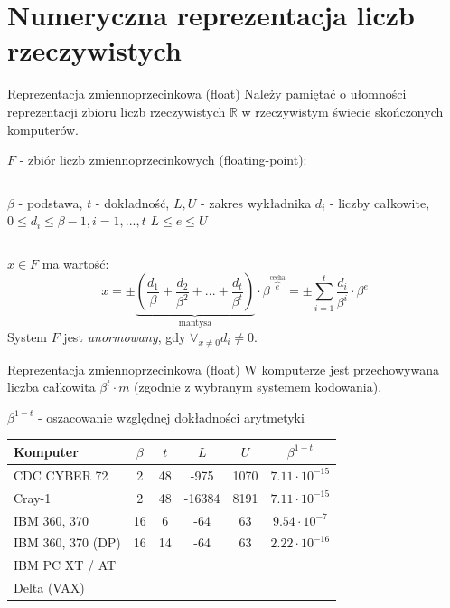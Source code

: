 \section{Numeryczna reprezentacja liczb rzeczywistych}
\begin{frame}{Reprezentacja zmiennoprzecinkowa (float)}
    Należy pamiętać o ułomności reprezentacji zbioru liczb rzeczywistych $\mathbb{R}$ w rzeczywistym świecie skończonych komputerów.
    \begin{block}{}
    $F$ - zbiór liczb zmiennoprzecinkowych (floating-point):\newline
    \begin{columns}
            $\beta$ - podstawa,\newline
            $t$ - dokładność,\newline
            $L, U$ - zakres wykładnika\newline
            $d_i$ - liczby całkowite,
            $0 \le d_i \le \beta - 1, i=1,...,t$
            $L \le e \le U$
    \end{columns}
    $x \in F$ ma wartość:
    \[
    x = \pm \underbrace{\left(\frac{d_1}{\beta} + \frac{d_2}{\beta^2} + ... + \frac{d_t}{\beta^t}\right)}_\text{mantysa} \cdot \beta^{\overbrace{e}^\text{cecha}}
    = \pm \sum_{i=1}^{t} \frac{d_i}{\beta^i} \cdot \beta^e
    \]        
    System $F$ jest {\it unormowany}, gdy $\forall_{x \ne 0} d_i \ne 0$.
    \end{block}

\end{frame}
\begin{frame}{Reprezentacja zmiennoprzecinkowa (float)}
    W komputerze jest przechowywana liczba całkowita $\beta^t \cdot m$ (zgodnie z wybranym systemem kodowania).

    $\beta^{1-t}$ - oszacowanie względnej dokładności arytmetyki

    \hspace{0.5cm}
    \centering
    \begin{tabular}{| l | c | c | c | c | c |}
    \hline
    Komputer & $\beta$ & $t$ & $L$ & $U$ & $\beta^{1-t}$ \\ \hline
    CDC CYBER 72 		& 2  & 48 & -975 	& 1070 & $7.11 \cdot 10^{-15}$ \\ \hline
    Cray-1 				& 2  & 48 & -16384	& 8191 & $7.11 \cdot 10^{-15}$ \\ \hline
    IBM 360, 370 		& 16 & 6  & -64		& 63   & $9.54 \cdot 10^{-7}$ \\ \hline
    IBM 360, 370 (DP) 	& 16 & 14 & -64 	& 63   & $2.22 \cdot 10^{-16}$ \\ \hline
    IBM PC XT / AT 		& & & & & \\ \hline
    Delta (VAX) 		& & & & & \\ \hline
    \end{tabular}
\end{frame}
